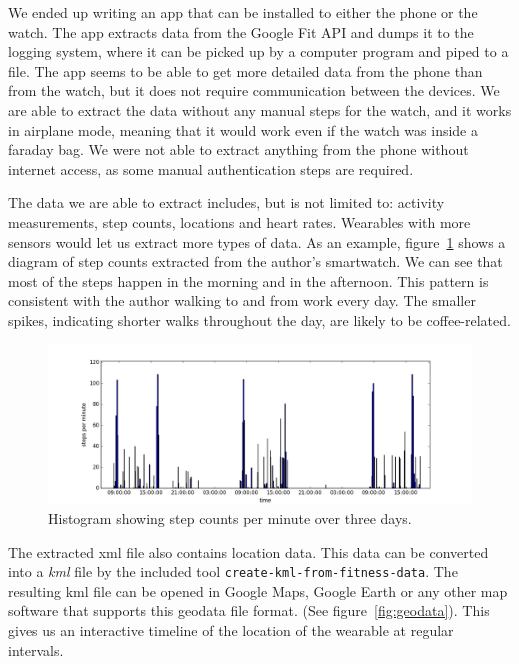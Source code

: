 \documentclass[a4paper,11pt,dvips]{article}
\begin{document}
We ended up writing an app that can be installed to either the phone or the watch. The app extracts data from the Google Fit API and dumps it to the logging system, where it can be picked up by a computer program and piped to a file. The app seems to be able to get more detailed data from the phone than from the watch, but it does not require communication between the devices. We are able to extract the data without any manual steps for the watch, and it works in airplane mode, meaning that it would work even if the watch was inside a faraday bag. We were not able to extract anything from the phone without internet access, as some manual authentication steps are required.

The data we are able to extract includes, but is not limited to: activity measurements, step counts, locations and heart rates. Wearables with more sensors would let us extract more types of data. As an example, figure~\ref{fig:stepcount} shows a diagram of step counts extracted from the author's smartwatch. We can see that most of the steps happen in the morning and in the afternoon. This pattern is consistent with the author walking to and from work every day. The smaller spikes, indicating shorter walks throughout the day, are likely to be coffee-related.

\begin{figure}
\noindent
\includegraphics[natwidth=1355bp,natheight=512bp,width=\linewidth]{stepcount}
\caption{Histogram showing step counts per minute over three days.}
\label{fig:stepcount}
\end{figure}

The extracted xml file also contains location data. This data can be converted into a \textit{kml} file by the included tool \texttt{create-kml-from-fitness-data}. The resulting kml file can be opened in Google Maps, Google Earth or any other map software that supports this geodata file format. (See figure~\ref{fig:geodata}). This gives us an interactive timeline of the location of the wearable at regular intervals.
\end{document}
